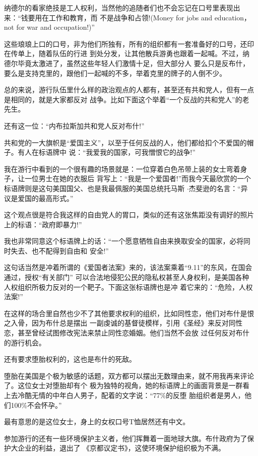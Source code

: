 ﻿\documentclass[11pt]{article}
\begin{document}
纳德尔的看家绝技是工人权利，当然他的追随者们也不会忘记在口号里表现出来：``钱要用在工作和教育，而
不是战争和占领!(Money for jobs and education， not for war and occupation!)''

这些琅琅上口的口号，非为他们所独有，所有的组织都有一套准备好的口号，还印在传单上，随着队伍的行进
到处分发，让其他散兵游勇也跟着一起喊。不过，纳德尔毕竟太激进了，虽然这些年轻人们激情十足，但大部分人
要么只是反布什，要么是支持克里的，跟他们一起喊的不多，举着克里的牌子的人倒不少。

总的来说，游行队伍里什么样的政治观点的人都有，甚至还有共和党人，但有一点是相同的，就是大家都反对
战争。比如下面这个举着``一个反战的共和党人''的老先生。

还有这一位：``内布拉斯加共和党人反对布什!''

共和党的一大旗帜是``爱国主义''，以至于任何反战的人，他们都给扣个不爱国的帽子。有人在标语牌中
说：``我爱我的国家，可我憎恨它的战争!''

我在游行中看到的一个很有趣的场景就是：一位穿着白色吊带上装的女士弯着身子，让一位男士在她的衣服后
背写上：``我是一个爱国者!''而我今天最欣赏的一个标语牌则是这句美国国父、也是我最佩服的美国总统托马斯
$\cdot$杰斐逊的名言：``异议是爱国的最高形式。''

这个观点很是符合我这样的自由党人的胃口，类似的还有这张焦距没有调好的照片上的标语：``政府即暴力!''

我也非常同意这个标语牌上的话：``一个愿意牺牲自由来换取安全的国家，必将同时失去、也不配得到自由和
安全!''

这句话当然是冲着所谓的《爱国者法案》来的，该法案乘着``9.11''的东风，在国会通过，授权``有关部门''
可以合法地侵犯公民的隐私权甚至人身权利，是美国各种人权组织所极力反对的一个靶子。下面这张标语牌也是冲
着它来的：``危险，人权法案!''

在这样的场合里自然也少不了其他要求权利的组织，比如同性恋，他们对布什是恨之入骨，因为布什总是摆出
一副虔诚的基督徒模样，引用《圣经》来反对同性恋，甚至曾经试图修改宪法来禁止同性恋婚姻。他们当然不会放
过任何反对布什的游行机会。


还有要求堕胎权利的，这也是布什的死敌。

堕胎在美国是个极为敏感的话题，双方都可以摆出无数理由来，就不用我再来评论了。这位女士对堕胎却有个
极为独特的视角，她的标语牌上的画面背景是一群看上去冷酷无情的中年白人男子，配着的文字说：``77\%的反堕
胎组织者是男人，他们100\%不会怀孕。''

最有意思的是这位女士，身上的女权口号T恤居然还有中文。

参加游行的还有一些环境保护主义者，他们挥舞着一面地球大旗。布什政府为了保护大企业的利益，退出了
《京都议定书》，这使环境保护组织极为不满。
\end{document}
